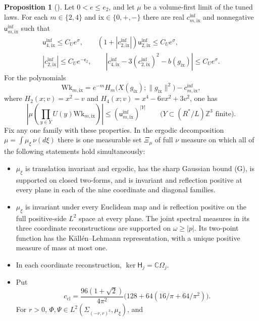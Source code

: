 \documentclass[11pt,letterpaper,reqno]{amsart}
\theoremstyle{definition}
\newtheorem{qcmproposition}{Proposition}[section]
\newenvironment{proposition}[1][]{\pushQED{\qed}\renewcommand{\qedsymbol}{$\blacksquare$}\begin{qcmproposition}[#1]}{\popQED\end{qcmproposition}}
\begin{document}
\begin{proposition}\label{qcm:tuned-component-inputs}
Let $0<e\le e_2$, and let $\mu$ be a volume-first limit of the
tuned laws. For each $m\in\{2,4\}$ and
$\mathrm{ix}\in\{0,+,-\}$ there are real
$c^{\mathrm{inf}}_{m,\mathrm{ix}}$ and nonnegative
$\mathsf u^{\mathrm{inf}}_{m,\mathrm{ix}}$ such that
\begin{gather*}
 \mathsf u^{\mathrm{inf}}_{4,\mathrm{ix}}\le C_Ue^\sigma,
 \qquad
 (1+|c^{\mathrm{inf}}_{2,\mathrm{ix}}|)
       \mathsf u^{\mathrm{inf}}_{2,\mathrm{ix}}\le C_Ue^\sigma,\\
 |c^{\mathrm{inf}}_{2,\mathrm{ix}}|\le C_Ue^{-\mathfrak e_2},
 \qquad
 |c^{\mathrm{inf}}_{4,\mathrm{ix}}
      -3(c^{\mathrm{inf}}_{2,\mathrm{ix}})^2-b(g_{\mathrm{ix}})|
       \le C_Ue^\sigma.
\end{gather*}
For the polynomials
\[
 \mathrm{Wk}_{m,\mathrm{ix}}
   =e^{-m}H_m\bigl(X(g_{\mathrm{ix}});\|g_{\mathrm{ix}}\|^2\bigr)
             -c^{\mathrm{inf}}_{m,\mathrm{ix}},
\]
where $H_2(x;v)=x^2-v$ and
$H_4(x;v)=x^4-6vx^2+3v^2$,
one has
\[
 \left|\mu\left(\prod_{y\in Y}U(y)
                         \mathrm{Wk}_{m,\mathrm{ix}}\right)\right|
 \le(\mathsf u^{\mathrm{inf}}_{m,\mathrm{ix}})^{|Y|}
 \qquad\bigl(Y\subset(R^*/L)\mathbb Z^3\text{ finite}\bigr).
\]
Fix any one family with these properties. In the ergodic
decomposition $\mu=\int\mu_\xi\,\nu(d\xi)$ there is one measurable
set $\Xi_\mu$ of full $\nu$ measure on which all of the following
statements hold simultaneously:
\begin{itemize}
\item[(D1)] $\mu_\xi$ is translation invariant and ergodic, has the
sharp Gaussian bound (G), is supported on closed two-forms, and
is invariant and reflection positive at every plane in each
of the nine coordinate and diagonal families.
\item[(D2)] $\mu_\xi$ is invariant under every Euclidean map and
is reflection positive on the full positive-side $L^2$ space at
every plane. The joint spectral measures in its three coordinate
reconstructions are supported on $\omega\ge|p|$. Its two-point
function has the K\"all\'en--Lehmann representation, with a unique
positive measure of mass at most one.
\item[(D3)] In each coordinate reconstruction,
$\ker\mathsf H_j=\mathbb C\Omega_j$.
\item[(D4)] Put
\[
 c_{\mathrm{cl}}=
 \frac{96(1+\sqrt2)}{4\pi^2}
       \bigl(128+64(16/\pi+64/\pi^2)\bigr).
\]
For $r>0$, $\Phi,\Psi\in L^2(\Sigma_{(-r,r)^3},\mu_\xi)$, and

\end{itemize}
\end{proposition}
\end{document}
